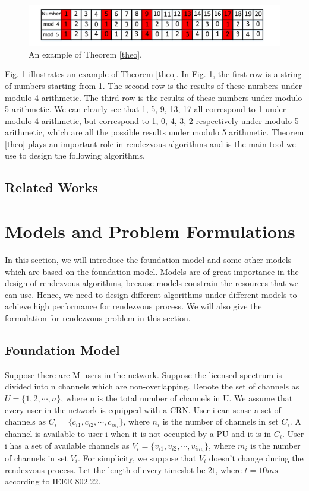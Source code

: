 \documentclass[10pt, conference, letterpaper]{IEEEtran}
\begin{document}
\begin{figure}[!t]
\centering
\includegraphics[width=1\columnwidth]{theo}
\caption{An example of Theorem \ref{theo}.}
\label{exp1}
\end{figure}

Fig. \ref{exp1} illustrates an example of Theorem \ref{theo}. In Fig. \ref{exp1}, the first row is a string of numbers starting from 1. The second row is the results of these numbers under modulo 4 arithmetic. The third row is the results of these numbers under modulo 5 arithmetic. We can clearly see that 1, 5, 9, 13, 17 all correspond to 1 under modulo 4 arithmetic, but correspond to 1, 0, 4, 3, 2 respectively under modulo 5 arithmetic, which are all the possible results under modulo 5 arithmetic. Theorem \ref{theo} plays an important role in rendezvous algorithms and is the main tool we use to design the following algorithms.
\subsection{Related Works}

\section{Models and Problem Formulations}
In this section, we will introduce the foundation model and some other models which are based on the foundation model. Models are of great importance in the design of rendezvous algorithms, because models constrain the resources that we can use. Hence, we need to design different algorithms under different models to achieve high performance for rendezvous process. We will also give the formulation for rendezvous problem in this section.
\subsection{Foundation Model}
Suppose there are M users in the network. Suppose the licensed spectrum is divided into n channels which are non-overlapping. Denote the set of channels as $U=\{1,2,\cdots,n\}$, where n is the total number of channels in U. We assume that every user in the network is equipped with a CRN. User i can sense a set of channels as
$C_i=\{c_{i1},c_{i2},\cdots,c_{in_i} \}$, where $n_i$ is the number of channels in set $C_i$. A channel is available to user i when it is not occupied by a PU and it is in $C_i$. User i has a set of available channels as $V_i = \{v_{i1},v_{i2},\cdots,v_{im_i}\}$, where $m_i$ is the number of channels in set $V_i$. For simplicity, we suppose that $V_i$ doesn't change during the rendezvous process. Let the length of every timeslot be 2t, where $t=10ms$ according to IEEE 802.22.
\end{document}
